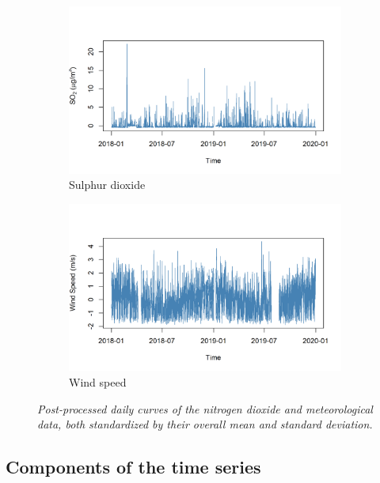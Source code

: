 \documentclass[a4paper, 10pt]{article}
\begin{document}
\begin{flushleft}
\begin{figure}[H]
         \begin{subfigure}{0.48\linewidth}
            \centering
            \includegraphics[width=\linewidth]{../img/scaled_so2.png}
         \caption{Sulphur dioxide}
         \end{subfigure}
         \hfill
         \begin{subfigure}{0.48\linewidth}
            \centering
            \includegraphics[width=\linewidth]{../img/scaled_speed.png}
            \caption{Wind speed}
         \end{subfigure}

         \caption{\textit{Post-processed daily curves of the nitrogen dioxide and meteorological data, both standardized by their overall mean and standard deviation.}}
      \end{figure}

      \subsection*{Components of the time series}     


\end{flushleft}
\end{document}
